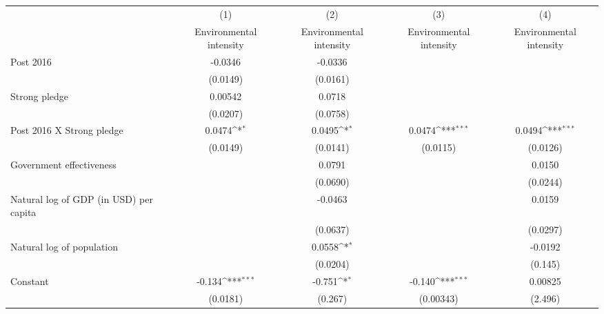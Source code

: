 {
\def\sym#1{\ifmmode^{#1}\else\(^{#1}\)\fi}
\begin{tabular}{l*{4}{c}}
\hline\hline
                    &\multicolumn{1}{c}{(1)}&\multicolumn{1}{c}{(2)}&\multicolumn{1}{c}{(3)}&\multicolumn{1}{c}{(4)}\\
                    &\multicolumn{1}{c}{Environmental intensity}&\multicolumn{1}{c}{Environmental intensity}&\multicolumn{1}{c}{Environmental intensity}&\multicolumn{1}{c}{Environmental intensity}\\
\hline
Post 2016           &     -0.0346         &     -0.0336         &                     &                     \\
                    &    (0.0149)         &    (0.0161)         &                     &                     \\
[1em]
Strong pledge       &     0.00542         &      0.0718         &                     &                     \\
                    &    (0.0207)         &    (0.0758)         &                     &                     \\
[1em]
Post 2016 X Strong pledge&      0.0474\sym{*}  &      0.0495\sym{*}  &      0.0474\sym{***}&      0.0494\sym{***}\\
                    &    (0.0149)         &    (0.0141)         &    (0.0115)         &    (0.0126)         \\
[1em]
Government effectiveness&                     &      0.0791         &                     &      0.0150         \\
                    &                     &    (0.0690)         &                     &    (0.0244)         \\
[1em]
Natural log of GDP (in USD) per capita&                     &     -0.0463         &                     &      0.0159         \\
                    &                     &    (0.0637)         &                     &    (0.0297)         \\
[1em]
Natural log of population&                     &      0.0558\sym{*}  &                     &     -0.0192         \\
                    &                     &    (0.0204)         &                     &     (0.145)         \\
[1em]
Constant            &      -0.134\sym{***}&      -0.751\sym{*}  &      -0.140\sym{***}&     0.00825         \\
                    &    (0.0181)         &     (0.267)         &   (0.00343)         &     (2.496)         \\

\end{tabular}}
